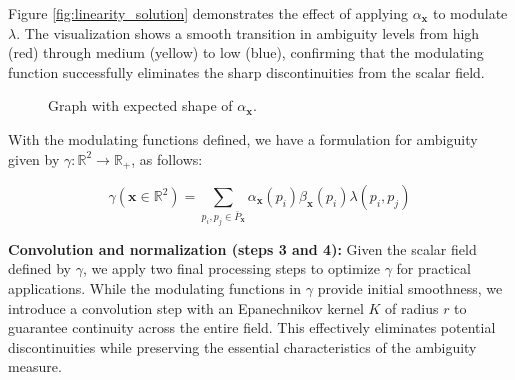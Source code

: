 Figure \ref{fig:linearity_solution} demonstrates the effect of applying $\alpha_{\mathbf{x}}$ to modulate $\lambda$. The visualization shows a smooth transition in ambiguity levels from high (red) through medium (yellow) to low (blue), confirming that the modulating function successfully eliminates the sharp discontinuities from the scalar field.

\begin{figure}[h]
\centering
{}
\caption{Graph with expected shape of $\alpha_{\mathbf{x}}$.}
\label{fig:alpha}
\end{figure}


With the modulating functions defined, we have a formulation for ambiguity given by $\gamma : \mathbb{R}^2 \rightarrow \mathbb{R}_{+}$, as follows:

\begin{equation}
\gamma(\mathbf{x} \in \mathbb{R}^2) = \sum_{p_i, p_j \in \bar{P}_{\mathbf{x}}}
\alpha_{\mathbf{x}}(p_i) \beta_{\mathbf{x}}(p_i) \lambda(p_i, p_j)
\end{equation}



\textbf{Convolution and normalization (steps 3 and 4):}
Given the scalar field defined by $\gamma$, we apply two final processing steps to optimize $\gamma$ for practical applications. While the modulating functions in $\gamma$ provide initial smoothness, we introduce a convolution step with an Epanechnikov kernel\cite{epanechnikov:1969} $K$ of radius $r$ to guarantee continuity across the entire field. This effectively eliminates potential discontinuities while preserving the essential characteristics of the ambiguity measure.

